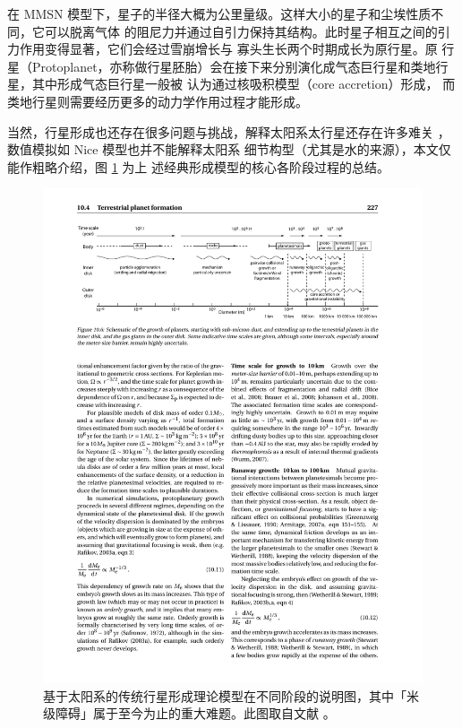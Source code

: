在 MMSN 模型下，星子的半径大概为公里量级。这样大小的星子和尘埃性质不同，它可以脱离气体
的阻尼力并通过自引力保持其结构。此时星子相互之间的引力作用变得显著，它们会经过雪崩增长与
寡头生长两个时期成长为原行星\cite{Greenberg1978,Kokubo1996,Rafikov2003,Lissauer1993}。原
行星（Protoplanet，亦称做行星胚胎）会在接下来分别演化成气态巨行星和类地行星，其中形成气态巨行星一般被
认为通过核吸积模型（core accretion）形成\cite{Mizuno1980,BodenheimerPollack1986,Pollack1996}，
而类地行星则需要经历更多的动力学作用过程才能形成\cite{Chambers1998}。

当然，行星形成也还存在很多问题与挑战，解释太阳系太行星还存在许多难关
\cite{Walsh2011,Morbidelli2005}，数值模拟如 Nice 模型\cite{Gomes2005Nice}也并不能解释太阳系
细节构型（尤其是水的来源\cite{Raymond2009}），本文仅能作粗略介绍，图 \ref{fig:pfstage} 为上
述经典形成模型的核心各阶段过程的总结。

\begin{figure}[t]
\centering
\includegraphics[width=1.0\textwidth]{figures/chapter1/fig11_pfsequence.pdf}
\caption[基于太阳系的传统行星形成理论模型在不同阶段的说明图，其中「米级障碍」属于至今为止的重大难题。图片版权 Michael Perryman。]{基于太阳系的传统行星形成理论模型在不同阶段的说明图，其中「米级障碍」属于至今为止的重大难题。此图取自文献 。}
\label{fig:pfstage}
\end{figure}


